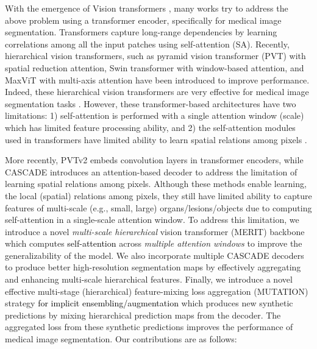 \documentclass{midl}
\begin{document}
With the emergence of Vision transformers \cite{dosovitskiy2020image}, many works \cite{cao2021swin, chen2021transunet, dong2021polyp, wang2022stepwise} try to address the above problem using a transformer encoder, specifically for medical image segmentation. Transformers capture long-range dependencies by learning correlations among all the input patches using self-attention (SA). Recently, hierarchical vision transformers, such as pyramid vision transformer (PVT) \cite{wang2021pyramid} with spatial reduction attention, Swin transformer \cite{liu2021swin} with window-based attention, and MaxViT \cite{tu2022maxvit} with multi-axis attention have been introduced to improve performance. Indeed, these hierarchical vision transformers are very effective for medical image segmentation tasks \cite{cao2021swin, dong2021polyp, wang2022stepwise}. However, these transformer-based architectures have two limitations: 1) self-attention is performed with a single attention window (scale) which has limited feature processing ability, and 2) the self-attention modules used in transformers have limited ability to learn spatial relations among pixels \cite{chu2021conditional}. 



More recently, PVTv2 \cite{wang2022pvt} embeds convolution layers in transformer encoders, while CASCADE \cite{rahman2023medical} introduces an attention-based decoder to address the limitation of learning spatial relations among pixels. Although these methods enable learning, the local (spatial) relations among pixels, they still have limited ability to capture features of multi-scale (e.g., small, large) organs/lesions/objects due to computing self-attention in a single-scale attention window. To address this limitation, we introduce a novel \textit{multi-scale hierarchical} vision transformer (MERIT) backbone which computes \textcolor{black}{self-attention} across \textit{multiple attention windows} to improve the generalizability of the model. We also incorporate multiple CASCADE decoders to produce better high-resolution segmentation maps by effectively aggregating and enhancing multi-scale hierarchical features. Finally, we introduce a novel effective multi-stage (hierarchical) feature-mixing loss aggregation (MUTATION) strategy \textcolor{black}{for implicit ensembling/augmentation} which produces new synthetic predictions by mixing hierarchical prediction maps from the decoder. The aggregated loss from these synthetic predictions improves the performance of medical image segmentation. Our contributions are as follows:
\vspace{-0.3cm} 
\end{document}

